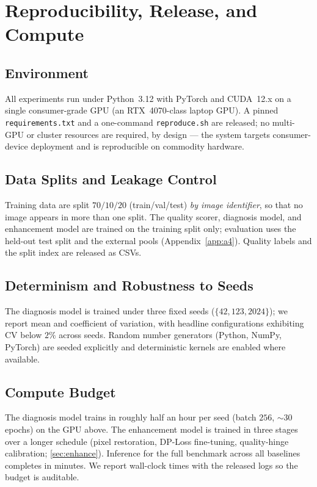 
\section{Reproducibility, Release, and Compute}\label{app:a26}

\subsection{Environment}\label{app:a26-env}
All experiments run under Python~3.12 with PyTorch and CUDA~12.x on a single consumer-grade GPU
(an RTX~4070-class laptop GPU). A pinned \texttt{requirements.txt} and a one-command
\texttt{reproduce.sh} are released; no multi-GPU or cluster resources are required, by design ---
the system targets consumer-device deployment and is reproducible on commodity hardware.

\subsection{Data Splits and Leakage Control}\label{app:a26-splits}
Training data are split $70/10/20$ (train/val/test) \emph{by image identifier}, so that no image
appears in more than one split. The quality scorer, diagnosis model, and enhancement model are
trained on the training split only; \itb evaluation uses the held-out test split and the external
pools (Appendix~\ref{app:a4}). Quality labels and the split index are released as CSVs.

\subsection{Determinism and Robustness to Seeds}\label{app:a26-seeds}
The diagnosis model is trained under three fixed seeds ($\{42, 123, 2024\}$); we report mean and
coefficient of variation, with headline configurations exhibiting CV below $2\%$ across seeds. Random
number generators (Python, NumPy, PyTorch) are seeded explicitly and deterministic kernels are
enabled where available.

\subsection{Compute Budget}\label{app:a26-compute}
The diagnosis model trains in roughly half an hour per seed (batch $256$, $\sim\!30$ epochs) on the
GPU above. The enhancement model is trained in three stages over a longer schedule (pixel
restoration, DP-Loss fine-tuning, quality-hinge calibration; \cref{sec:enhance}). Inference for the
full \itb benchmark across all baselines completes in minutes. We report wall-clock times with the
released logs so the budget is auditable.

